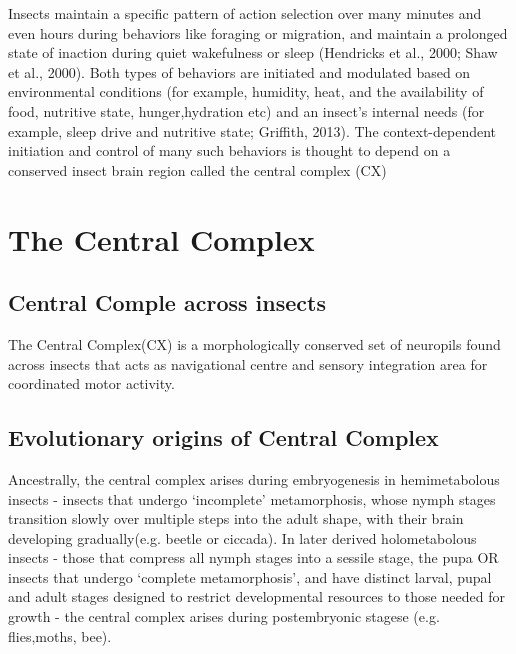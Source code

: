         Insects maintain a specific pattern of action selection over many minutes and even hours during behaviors like foraging or migration, and maintain a prolonged state of inaction during quiet wakefulness or sleep (Hendricks et al., 2000; Shaw et al., 2000). Both types of behaviors are initiated and modulated based on environmental conditions (for example, humidity, heat, and the availability of food, nutritive state, hunger,hydration etc) and an insect’s internal needs (for example, sleep drive and nutritive state; Griffith, 2013). The context-dependent initiation and control of many such behaviors is thought to depend on a conserved insect brain region called the central complex (CX) %


\section{The Central Complex}

    \subsection{Central Comple across insects}
        The Central Complex(CX) is a morphologically conserved set of neuropils found across insects
        that acts as navigational centre and sensory integration area for coordinated motor activity.

    \subsection{Evolutionary origins of Central Complex}
        Ancestrally, the central complex arises during embryogenesis in hemimetabolous insects - insects that undergo ‘incomplete’ metamorphosis, whose nymph stages transition slowly over multiple steps into the adult shape, with their brain developing gradually(e.g. beetle or ciccada).
        In later derived holometabolous insects -  those that compress all nymph stages into a sessile stage, the pupa OR insects that undergo ‘complete metamorphosis’, and have distinct larval, pupal and adult stages designed to restrict developmental resources to those needed for growth - the central complex arises during  postembryonic stagese (e.g. flies,moths, bee).

